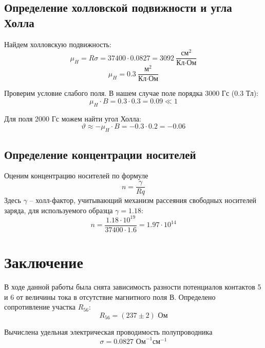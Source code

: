 \subsection{Определение холловской подвижности и угла Холла}

Найдем холловскую подвижность:
\begin{equation}
	\mu_H=R\sigma=37400\cdot0.0827=3092\ \frac{\text{см}^2}{\text{Кл}\cdot \text{Ом}}
\end{equation}
\begin{equation}
	\mu_H=0.3\ \frac{\text{м}^2}{\text{Кл}\cdot \text{Ом}}
\end{equation}

Проверим условие слабого поля. В нашем случае поле порядка 3000 Гс (0.3 Тл):
\begin{equation}
	\mu_H\cdot B=0.3\cdot0.3=0.09 \ll 1
\end{equation}

Для поля 2000 Гс можем найти угол Холла:
\begin{equation}
	\vartheta\approx-\mu_H\cdot B=-0.3\cdot0.2=-0.06
\end{equation}

\subsection{Определение концентрации носителей}

Оценим концентрацию носителей по формуле
\begin{equation}
	n=\frac{\gamma}{Rq}
\end{equation}
Здесь $\gamma$ -- холл-фактор, учитывающий механизм рассеяния свободных носителей заряда, для используемого образца $\gamma=1.18$:
\begin{equation}
	n=\frac{1.18\cdot10^{19}}{37400\cdot1.6}=1.97\cdot10^{14}
\end{equation}

\newpage
\section{Заключение}

В ходе данной работы была снята зависимость разности потенциалов контактов 5 и 6 от
величины тока в отсутствие магнитного поля В. Определено сопротивление участка $R_{56}$:
\begin{equation}
	R_{56}=(237\pm 2) \text{ Ом}
\end{equation}

Вычислена удельная электрическая проводимость полупроводника
\begin{equation}
	\sigma=0.0827 \text{ Ом}^{-1}\text{см}^{-1}
\end{equation}


